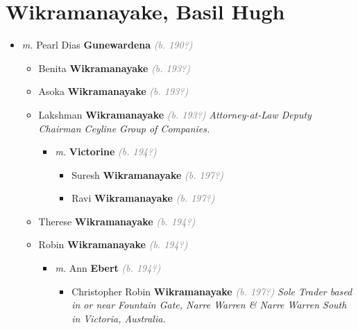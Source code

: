 \documentclass[10pt, openany]{book}
\begin{document}
\chapter{Wikramanayake, Basil Hugh}
\label{00004002}
\textcolor{slmaroon}{\textit{}}
\begin{itemize}
\item{\textit{m.} Pearl Dias \textbf{Gunewardena} \textcolor{gray}{\textit{(b. 190?)}}   \label{couple:00004002:00004003} \begin{itemize}
\item{Benita \textbf{Wikramanayake} \textcolor{gray}{\textit{(b. 193?)}}
 }
\item{Asoka \textbf{Wikramanayake} \textcolor{gray}{\textit{(b. 193?)}}
 }
\item{Lakshman \textbf{Wikramanayake} \textcolor{gray}{\textit{(b. 193?)}} \textcolor{slmaroon}{\textit{Attorney-at-Law Deputy Chairman Ceyline Group of Companies.}}
\begin{itemize}
\item{\textit{m.}  \textbf{Victorine} \textcolor{gray}{\textit{(b. 194?)}}   \label{couple:00004006:00004007} \begin{itemize}
\item{Suresh \textbf{Wikramanayake} \textcolor{gray}{\textit{(b. 197?)}}
 }
\item{Ravi \textbf{Wikramanayake} \textcolor{gray}{\textit{(b. 197?)}}
 }
\end{itemize}}
\end{itemize}
 }
\item{Therese \textbf{Wikramanayake} \textcolor{gray}{\textit{(b. 194?)}}
 }
\item{Robin \textbf{Wikramanayake} \textcolor{gray}{\textit{(b. 194?)}}
\begin{itemize}
\item{\textit{m.} Ann \textbf{Ebert} \textcolor{gray}{\textit{(b. 194?)}}   \label{couple:00004011:00004012} \begin{itemize}
\item{Christopher Robin \textbf{Wikramanayake} \textcolor{gray}{\textit{(b. 197?)}} \textcolor{slmaroon}{\textit{Sole Trader based in or near Fountain Gate, Narre Warren \& Narre Warren South in Victoria, Australia.}}
  }
\end{itemize}}

\end{itemize}}
\end{itemize}}
\end{itemize}
\end{document}
